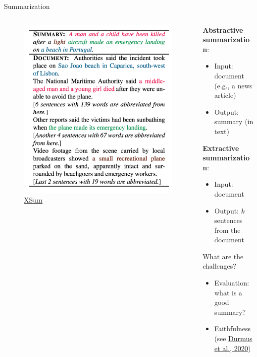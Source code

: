 \documentclass[usenames,dvipsnames,notes,11pt,aspectratio=169,hyperref={colorlinks=true, linkcolor=blue}]{beamer}
\begin{document}
\begin{frame}
    {Summarization}
    \begin{columns}
        \begin{column}{0.5\textwidth}
            \begin{figure}
                \includegraphics[height=0.8\textwidth]{figures/xsum}
                \caption{\href{https://aclanthology.org/D18-1206.pdf}{XSum}}
            \end{figure}
        \end{column}
        \begin{column}{0.5\textwidth}
            \textbf{Abstractive summarization}:\\
            \begin{itemize}
                \item[] Input: document (e.g., a news article)
                \item[] Output: summary (in text)
            \end{itemize}
            
            \medskip
            \textbf{Extractive summarization}:\\
            \begin{itemize}
                \item[] Input: document 
                \item[] Output: $k$ sentences from the document 
            \end{itemize}

            \bigskip
            What are the challenges?\\
            \begin{itemize}
                \item Evaluation: what is a good summary?
                \item Faithfulness (see \href{https://arxiv.org/abs/2005.03754}{Durmus et al., 2020})
            \end{itemize}
        \end{column}
    \end{columns}
\end{frame}
\end{document}
